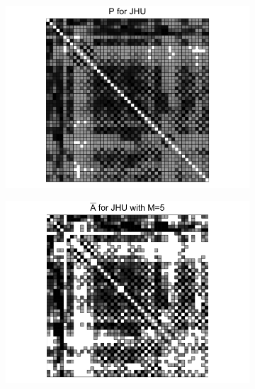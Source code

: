 \documentclass[a4paper]{article}
\begin{document}
\begin{figure}
\centering
\begin{subfigure}{.33\textwidth}
  \centering
  \includegraphics[width=1.2\linewidth]{P_JHU.png}
\end{subfigure}%
\begin{subfigure}{.33\textwidth}
  \centering
  \includegraphics[width=1.2\linewidth]{Abar_JHU_m5.png}
\end{subfigure}
\begin{subfigure}{.33\textwidth}
  \centering

\end{subfigure}
\end{figure}
\end{document}
